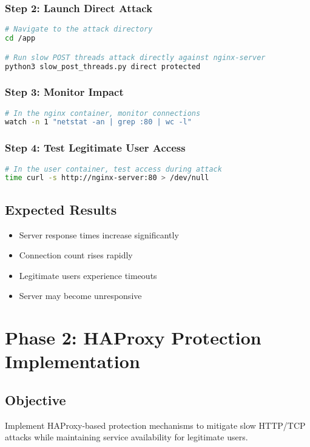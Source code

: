 \documentclass[12pt]{article}
\begin{document}
\subsubsection{Step 2: Launch Direct Attack}
\begin{lstlisting}[language=bash]
# Navigate to the attack directory
cd /app

# Run slow POST threads attack directly against nginx-server
python3 slow_post_threads.py direct protected
\end{lstlisting}

\subsubsection{Step 3: Monitor Impact}
\begin{lstlisting}[language=bash]
# In the nginx container, monitor connections
watch -n 1 "netstat -an | grep :80 | wc -l"
\end{lstlisting}

\subsubsection{Step 4: Test Legitimate User Access}
\begin{lstlisting}[language=bash]
# In the user container, test access during attack
time curl -s http://nginx-server:80 > /dev/null
\end{lstlisting}

\subsection{Expected Results}
\begin{itemize}
    \item Server response times increase significantly
    \item Connection count rises rapidly
    \item Legitimate users experience timeouts
    \item Server may become unresponsive
\end{itemize}

\section{Phase 2: HAProxy Protection Implementation}

\subsection{Objective}
Implement HAProxy-based protection mechanisms to mitigate slow HTTP/TCP attacks while maintaining service availability for legitimate users.
\end{document}
